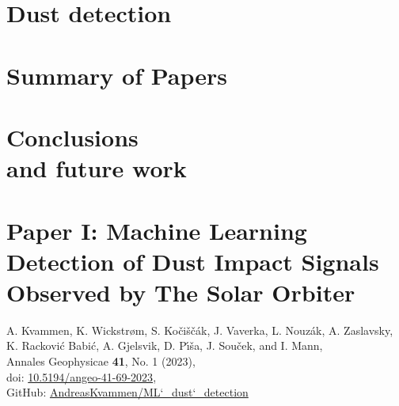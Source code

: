 \documentclass[11pt,twoside,openright]{book}
\begin{document}
\chapter{Dust detection}\label{ch:detection}


\chapter{Summary of Papers}\label{ch:sum-paper}


\chapter[Conclusions and future work]{Conclusions\\and future work}\label{ch:conclusion}





\backmatter

\printbibliography

% 



\chapter[Paper I: Machine Learning Detection of Dust Impact Signals Observed by The Solar Orbiter]{Paper I: Machine Learning\\Detection of Dust Impact Signals\\Observed by The Solar Orbiter}
A. Kvammen, K. Wickstr{\o}m, S. Ko{\v{c}}i{\v{s}}{\v{c}}{\'a}k, J. Vaverka, L. Nouz{\'a}k, A. Zaslavsky, K. Rackovi{\'c} Babi{\'c}, A. Gjelsvik, D. P{\'\i}{\v{s}}a, J. Sou{\v{c}}ek, and I. Mann, \\
Annales Geophysicae {\bf 41}, No. 1 (2023),\\
doi: \href{https://doi.org/10.5194/angeo-41-69-2023}{10.5194/angeo-41-69-2023},\\
GitHub: \href{https://zenodo.org/records/7404457}{AndreasKvammen/ML\char`_dust\char`_detection}\\
\newpage\null\newpage

\end{document}
